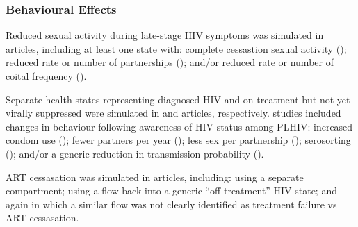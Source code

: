 \subsubsection{Behavioural Effects} %
\label{sss:res:beh}
Reduced sexual activity during late-stage HIV symptoms was simulated in  articles,
including at least one state with:
complete cessastion sexual activity ();  %
reduced rate or number of partnerships (); and/or
reduced rate or number of coital frequency (). %
\par
Separate health states representing diagnosed HIV and on-treatment but not yet virally suppressed
were simulated in  and  articles, respectively.
 studies included changes in behaviour following awareness of HIV status among PLHIV:
increased condom use ();
fewer partners per year ();
less sex per partnership (); %
serosorting\cite{} (); and/or
a generic reduction in transmission probability ().
\par
ART cessasation was simulated in  articles, including:  %
 using a separate compartment; %
 using a flow back into a generic ``off-treatment'' HIV state; and again %
 in which a similar flow was not clearly identified as treatment failure vs ART cessasation.  %
